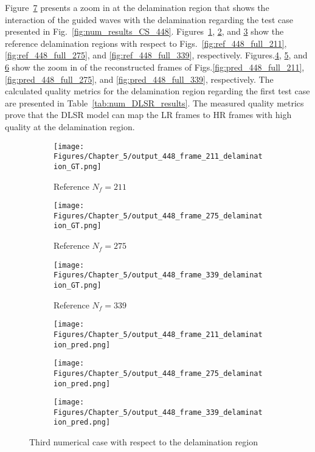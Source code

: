 Figure~\ref{fig:num_results_CS_damage_area_448} presents a zoom in at the delamination region that shows the interaction of the guided waves with the delamination regarding the test case presented in Fig.~\ref{fig:num_results_CS_448}.
Figures~\ref{fig:ref_448_damage_211}, \ref{fig:ref_448_damage_275}, and \ref{fig:ref_448_damage_339} show the reference delamination regions with respect to Figs.~\ref{fig:ref_448_full_211}, \ref{fig:ref_448_full_275}, and \ref{fig:ref_448_full_339}, respectively.
Figures.\ref{fig:pred_448_damage_211}, \ref{fig:pred_448_damage_275}, and \ref{fig:pred_448_damage_339} show the zoom in of the reconstructed frames of Figs.\ref{fig:pred_448_full_211}, \ref{fig:pred_448_full_275}, and \ref{fig:pred_448_full_339}, respectively.
The calculated quality metrics for the delamination region regarding the first test case are presented in Table~\ref{tab:num_DLSR_results}.
The measured quality metrics prove that the DLSR model can map the LR frames to HR frames with high quality at the delamination region.
\begin{figure} [!ht]
	\centering
	\begin{subfigure}[b]{.32\textwidth}
		\centering
		\texttt{[image: Figures/Chapter\_5/output\_448\_frame\_211\_delamination\_GT.png]}
		\caption{Reference $N_f=211$}
		\label{fig:ref_448_damage_211}
	\end{subfigure}
	\begin{subfigure}[b]{.32\textwidth}
		\centering
		\texttt{[image: Figures/Chapter\_5/output\_448\_frame\_275\_delamination\_GT.png]}
		\caption{Reference $N_f=275$}
		\label{fig:ref_448_damage_275}
	\end{subfigure}
	\begin{subfigure}[b]{.32\textwidth}
		\centering
		\texttt{[image: Figures/Chapter\_5/output\_448\_frame\_339\_delamination\_GT.png]}
		\caption{Reference $N_f=339$}
		\label{fig:ref_448_damage_339}	
	\end{subfigure}
	\begin{subfigure}[b]{.32\textwidth}
		\centering
		\texttt{[image: Figures/Chapter\_5/output\_448\_frame\_211\_delamination\_pred.png]}
		\caption{}
		\label{fig:pred_448_damage_211}
	\end{subfigure}
	\begin{subfigure}[b]{.32\textwidth}
		\centering
		\texttt{[image: Figures/Chapter\_5/output\_448\_frame\_275\_delamination\_pred.png]}
		\caption{}
		\label{fig:pred_448_damage_275}
	\end{subfigure}
	\begin{subfigure}[b]{.32\textwidth}
		\centering
		\texttt{[image: Figures/Chapter\_5/output\_448\_frame\_339\_delamination\_pred.png]}
		\caption{}
		\label{fig:pred_448_damage_339}	
	\end{subfigure}
	\caption{Third numerical case with respect to the delamination region}
	\label{fig:num_results_CS_damage_area_448}
\end{figure}

